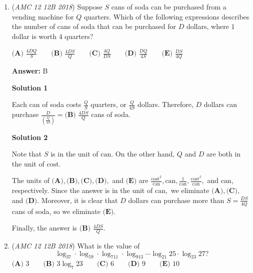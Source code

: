 \begin{enumerate}
 



\textbf{Solution 3}

We complement count. We know that we have $2^8$ subsets in all, including the empty subset. We subtract $\dbinom{4}{0}+\dbinom{4}{1}+\dbinom{4}{2}+\dbinom{4}{3}+\dbinom{4}{4} = 2^4 = 16$ We have $2^8-16 = 256-16 = \boxed{\textbf{(D) }240}$ ways to choose a subset of the eight numbers that include a prime number. ~hh99754539

 


	\item (\textit{AMC 12 12B 2018}) Suppose $S$ cans of soda can be purchased from a vending machine for $Q$ quarters. Which of the following expressions describes the number of cans of soda that can be purchased for $D$ dollars, where $1$ dollar is worth $4$ quarters?


 $\textbf{(A) } \frac{4DQ}{S} \qquad \textbf{(B) } \frac{4DS}{Q} \qquad \textbf{(C) } \frac{4Q}{DS} \qquad \textbf{(D) } \frac{DQ}{4S} \qquad \textbf{(E) } \frac{DS}{4Q}$

 \textbf{Answer: }B



\textbf{Solution 1}

Each can of soda costs $\frac QS$ quarters, or $\frac{Q}{4S}$ dollars. Therefore, $D$ dollars can purchase $\frac{D}{\left(\frac{Q}{4S}\right)}=\boxed{\textbf{(B) } \frac{4DS}{Q}}$ cans of soda.

 



\textbf{Solution 2}

Note that $S$ is in the unit of $\text{can}.$ On the other hand, $Q$ and $D$ are both in the unit of $\text{cost}.$

 The units of $\textbf{(A)},\textbf{(B)},\textbf{(C)},\textbf{(D)},$ and $\textbf{(E)}$ are $\frac{\text{cost}^2}{\text{can}},\text{can},\frac{1}{\text{can}},\frac{\text{cost}^2}{\text{can}},$ and $\text{can},$ respectively. Since the answer is in the unit of $\text{can},$ we eliminate $\textbf{(A)},\textbf{(C)},$ and $\textbf{(D)}.$ Moreover, it is clear that $D$ dollars can purchase more than $S=\frac{DS}{4Q}$ cans of soda, so we eliminate $\textbf{(E)}.$

 Finally, the answer is $\boxed{\textbf{(B) } \frac{4DS}{Q}}.$



	\item (\textit{AMC 12 12B 2018}) What is the value of 
 \[\log_37\cdot\log_59\cdot\log_711\cdot\log_913\cdots\log_{21}25\cdot\log_{23}27?\]
$\textbf{(A) } 3 \qquad \textbf{(B) } 3\log_{7}23 \qquad \textbf{(C) } 6 \qquad \textbf{(D) } 9 \qquad \textbf{(E) } 10$


\end{enumerate}
